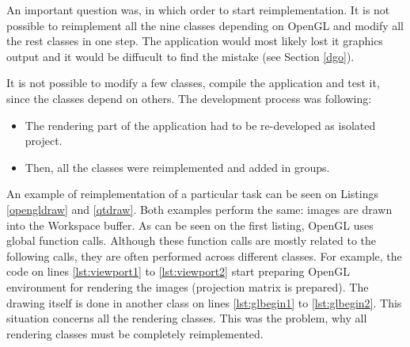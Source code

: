 An important question was, in which order to start reimplementation. It is not possible to reimplement all the nine classes depending on OpenGL and modify all the rest classes in one step. The application would most likely lost it graphics output and it would be diffucult to find the mistake (see Section \ref{dgo}).

It is not possible to modify a few classes, compile the application and test it, since the classes depend on others. The development process was following:

\begin{itemize}
\item The rendering part of the application had to be re-developed as isolated project.
\item Then, all the classes were reimplemented and added in groups.
\end{itemize}

An example of reimplementation of a particular task can be seen on Listings \ref{opengldraw} and \ref{qtdraw}. Both examples perform the same: images are drawn into the Workspace buffer. As can be seen on the first listing, OpenGL uses global function calls. Although these function calls are mostly related to the following calls, they are often performed across different classes. For example, the code on lines \ref{lst:viewport1} to \ref{lst:viewport2} start preparing OpenGL environment for rendering the images (projection matrix is prepared). The drawing itself is done in another class on lines \ref{lst:glbegin1} to \ref{lst:glbegin2}. This situation concerns all the rendering classes. This was the problem, why all rendering classes must be completely reimplemented.

